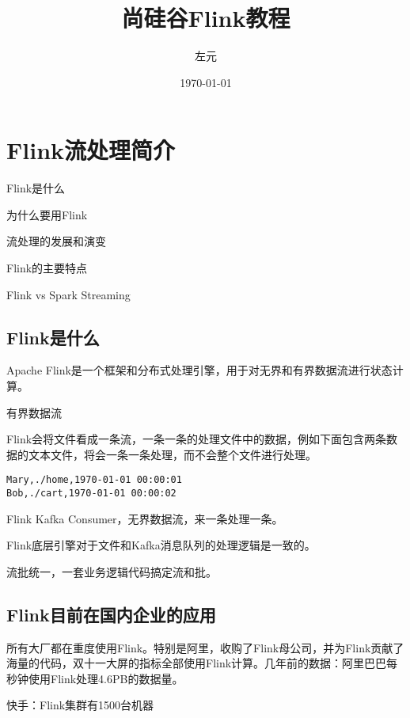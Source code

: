\documentclass[cn,11pt,chinese]{elegantbook}
\title{尚硅谷Flink教程}
\author{左元}
\date{\today}
\begin{document}
\maketitle
\frontmatter

\tableofcontents

\mainmatter

\chapter{Flink流处理简介}

\begin{introduction}
  \item Flink是什么
  \item 为什么要用Flink
  \item 流处理的发展和演变
  \item Flink的主要特点
  \item Flink vs Spark Streaming
\end{introduction}

\section{Flink是什么}

Apache Flink是一个框架和分布式处理引擎，用于对无界和有界数据流进行状态计算。

有界数据流

Flink会将文件看成一条流，一条一条的处理文件中的数据，例如下面包含两条数据的文本文件，将会一条一条处理，而不会整个文件进行处理。

\begin{lstlisting}[caption={文件流}]
Mary,./home,1970-01-01 00:00:01
Bob,./cart,1970-01-01 00:00:02
\end{lstlisting}

Flink Kafka Consumer，无界数据流，来一条处理一条。

Flink底层引擎对于文件和Kafka消息队列的处理逻辑是一致的。

流批统一，一套业务逻辑代码搞定流和批。

\section{Flink目前在国内企业的应用}

所有大厂都在重度使用Flink。特别是阿里，收购了Flink母公司，并为Flink贡献了海量的代码，双十一大屏的指标全部使用Flink计算。几年前的数据：阿里巴巴每秒钟使用Flink处理4.6PB的数据量。

快手：Flink集群有1500台机器
\end{document}
